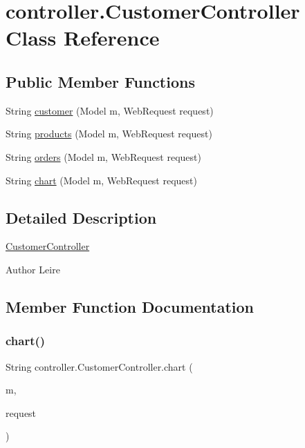 \hypertarget{classcontroller_1_1_customer_controller}{}\section{controller.\+Customer\+Controller Class Reference}
\label{classcontroller_1_1_customer_controller}
\subsection*{Public Member Functions}
\begin{DoxyCompactItemize}
\item 
String \mbox{\hyperlink{classcontroller_1_1_customer_controller_a7e9dfeb10a185ebb3a871d5912772f51}{customer}} (Model m, Web\+Request request)
\item 
String \mbox{\hyperlink{classcontroller_1_1_customer_controller_afb6819bc842a49356132ba336b1694d9}{products}} (Model m, Web\+Request request)
\item 
String \mbox{\hyperlink{classcontroller_1_1_customer_controller_a757c2b6e8bb1b2da2b07616d389b0b93}{orders}} (Model m, Web\+Request request)
\item 
String \mbox{\hyperlink{classcontroller_1_1_customer_controller_add866b64d6e08876db8b97087eaeb389}{chart}} (Model m, Web\+Request request)
\end{DoxyCompactItemize}


\subsection{Detailed Description}
\mbox{\hyperlink{classcontroller_1_1_customer_controller}{Customer\+Controller}} \begin{DoxyAuthor}{Author}
Leire 
\end{DoxyAuthor}


\subsection{Member Function Documentation}
\mbox{\label{classcontroller_1_1_customer_controller_add866b64d6e08876db8b97087eaeb389}} 
\subsubsection{\texorpdfstring{chart()}{chart()}}
{\footnotesize\ttfamily String controller.\+Customer\+Controller.\+chart (\begin{DoxyParamCaption}\item[{Model}]{m,  }\item[{Web\+Request}]{request }\end{DoxyParamCaption})\hspace{0.3cm}{\ttfamily [inline]}}

